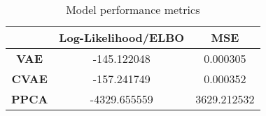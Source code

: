 \begin{table}
\centering
\caption{Model performance metrics}
\label{table:metrics}
\begin{tabular}{ccc}
\toprule
{} &  \textbf{Log-Likelihood/ELBO} &  \textbf{MSE} \\
\midrule
\textbf{VAE } &                   -145.122048 &      0.000305 \\
\textbf{CVAE} &                   -157.241749 &      0.000352 \\
\textbf{PPCA} &                  -4329.655559 &   3629.212532 \\
\bottomrule
\end{tabular}
\end{table}
